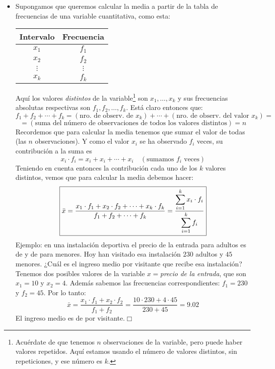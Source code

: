 \begin{itemize}
    \item Supongamos que queremos calcular la {\sf media a partir de la tabla de frecuencias de una variable cuantitativa}, como esta:
   \begin{center}
        \begin{tabular}{|c|c|}
        \hline
        \rule{0cm}{4mm}{\bf Intervalo}&{\bf Frecuencia}\\ \hline
        \rule{0cm}{4mm}$x_1$&$f_1$\\[2mm] \hline
        \rule{0cm}{4mm}$x_2$&$f_2$\\[2mm] \hline
        $\vdots$&$\vdots$\\[2mm] \hline
        \rule{0cm}{4mm}$x_k$&$f_k$\\[2mm] \hline
        \end{tabular}
        \end{center}
        Aquí los valores {\em distintos} de la variable\footnote{Acuérdate de que tenemos $n$ observaciones de la variable, pero puede haber valores repetidos. Aquí estamos usando el número de valores distintos, sin repeticiones, y ese número es $k$.} son $x_1,\ldots,x_k$ y sus frecuencias absolutas respectivas son $f_1,f_2,\ldots,f_k$. Está claro entonces que:
        \[f_1+f_2+\cdots+f_k=(\mbox{nro. de observ. de }x_k)+\cdots+(\mbox{nro. de observ. del valor }x_k)= \]
        \[=(\mbox{suma del número de observaciones de todos los valores distintos})=n\]
        Recordemos que para calcular la media tenemos que sumar el valor de todas (las $n$ observaciones). Y como el valor $x_i$ se ha observado $f_i$ veces, su contribución a la suma es
        \[x_i\cdot f_i=x_i+x_i+\cdots+x_i\quad (\mbox{sumamos $f_i$ veces})\]
        Teniendo en cuenta entonces la contribución cada uno de los $k$ valores distintos, vemos que
        para calcular la media debemos hacer:
        \[\fbox{$
        \bar x=\dfrac{x_1\cdot f_1+x_2\cdot f_2+\cdots+x_k\cdot f_k}{f_1+f_2+\cdots+f_k}=
        \dfrac{\displaystyle\sum_{i=1}^k x_i\cdot f_i}{\displaystyle\sum_{i=1}^k f_i}$}
        \]
        {\sf Ejemplo:} en una instalación deportiva el precio de la entrada para adultos es de  y de  para menores. Hoy han visitado esa instalación $230$ adultos y $45$ menores. ¿Cuál es el ingreso medio por visitante que recibe esa instalación?\\
        Tenemos dos posibles valores de la variable $x=${\em precio de la entrada}, que son $x_1=10$ y $x_2=4$. Además sabemos las frecuencias correspondientes: $f_1=230$ y $f_2=45$. Por lo tanto:
        \[\bar x=\dfrac{x_1\cdot f_1+x_2\cdot f_2}{f_1+f_2}=\dfrac{10\cdot 230+4\cdot 45}{230+45}=9.02\]
        El ingreso medio es de  por visitante.$\Box$


\end{itemize}
